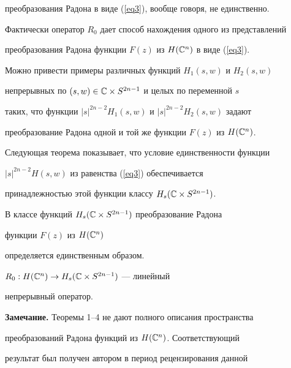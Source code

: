 преобразования Радона в виде (\ref{eq3}), вообще говоря, не единственно. 


Фактически оператор $R_0$ дает способ нахождения одного из представлений 


преобразования Радона функции $F(z)$ из $H(\Bbb C^n)$ в виде (\ref{eq3}).


Можно привести примеры различных функций $H_1(s,w)$ и $H_2(s,w)$ 


непрерывных по $(s,w)\in \Bbb C\times S^{2n-1}$ и целых по переменной $s$


таких, что функции $|s|^{2n-2}H_1(s,w)$ и $|s|^{2n-2}H_2(s,w)$ задают 


преобразование Радона одной и той же функции $F(z)$ из $H(\Bbb C^n)$. 


Следующая теорема показывает, что условие единственности функции


$|s|^{2n-2}H(s,w)$ из равенства (\ref{eq3}) обеспечивается 


принадлежностью этой функции классу $H_s(\Bbb C\times S^{2n-1})$.








\begin{thm}


В классе функций $H_s(\Bbb C\times S^{2n-1})$ преобразование Радона 


функции $F(z)$ из $H(\Bbb C^n)$ 


определяется единственным образом.


\end{thm}








\begin{thm}


$R_0:H(\Bbb C^n)\to H_s(\Bbb C\times S^{2n-1})$ --- линейный 


непрерывный оператор.


\end{thm}








{\bf Замечание. } Теоремы 1--4 не дают полного описания пространства 


преобразований Радона функций из $H(\Bbb C^n)$. Соответствующий 


результат был получен автором в период рецензирования данной 


